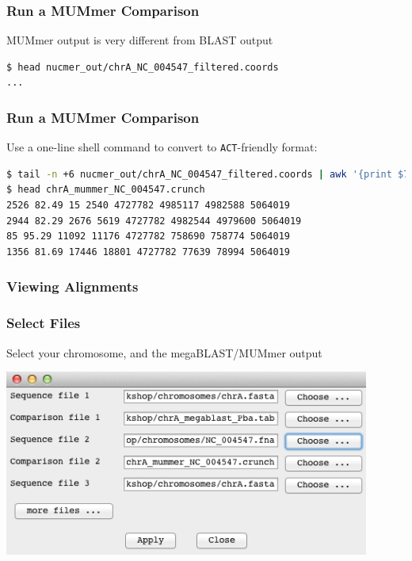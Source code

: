 \begin{frame}[fragile]
  \frametitle{Run a MUMmer Comparison}
  MUMmer output is very different from BLAST output
\begin{lstlisting}[language=bash]
$ head nucmer_out/chrA_NC_004547_filtered.coords
...
\end{lstlisting}
\end{frame}

\begin{frame}[fragile]
  \frametitle{Run a MUMmer Comparison}
  Use a one-line shell command to convert to \texttt{ACT}-friendly format:
\begin{lstlisting}[language=bash]
$ tail -n +6 nucmer_out/chrA_NC_004547_filtered.coords | awk '{print $7" "$10" "$1" "$2" "$12" "$4" "$5" "$13}' > chrA_mummer_NC_004547.crunch
$ head chrA_mummer_NC_004547.crunch 
2526 82.49 15 2540 4727782 4985117 4982588 5064019
2944 82.29 2676 5619 4727782 4982544 4979600 5064019
85 95.29 11092 11176 4727782 758690 758774 5064019
1356 81.69 17446 18801 4727782 77639 78994 5064019
\end{lstlisting}
\end{frame}

\subsubsection{Viewing Alignments}
\begin{frame}
  \frametitle{Select Files}    
  Select your chromosome, and the megaBLAST/MUMmer output
  \begin{center}
    \includegraphics[width=0.9\textwidth]{images/act_wgs8}     
  \end{center}
\end{frame}

